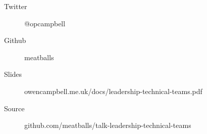 

\begin{frame}{}
  \begin{description}
    \item [Twitter] @opcampbell
    \item [Github] meatballs
  \end{description}
  \vfill
  \begin{description}
    \item [Slides] {\small owencampbell.me.uk/docs/leadership-technical-teams.pdf}
    \item [Source] {\small github.com/meatballs/talk-leadership-technical-teams}
  \end{description}

\end{frame}
